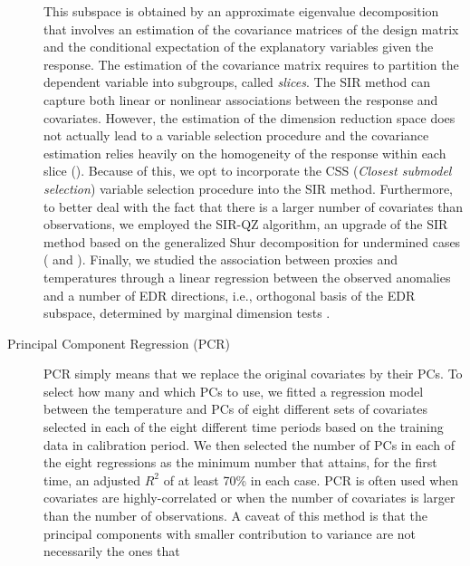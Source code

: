 \documentclass[12pt]{amsart}
\theoremstyle{plain}
\theoremstyle{definition}
\theoremstyle{remark}
\begin{document}
\begin{description}
  This subspace is obtained by an approximate eigenvalue decomposition that
  involves an estimation of the covariance matrices of the design matrix and
  the conditional expectation of the explanatory variables given the
  response. The
  estimation of the covariance matrix requires to partition the dependent variable into subgroups, called \textit{slices}.
  The SIR method can capture both linear or nonlinear associations between the response and
  covariates. However, the estimation of the dimension
  reduction space does not actually lead to a variable selection procedure and the
  covariance estimation relies heavily on the homogeneity of the response within
  each slice (\cite{Wu2010}). Because of this, we opt to incorporate the CSS
  (\textit{Closest submodel selection}) variable 
  selection procedure into the SIR method. Furthermore, to better deal with the fact that there is a larger number of
  covariates than observations, we employed the SIR-QZ algorithm, an upgrade of the SIR method based on the generalized Shur decomposition for undermined cases (\cite{Coudret2014} and \cite{Coudret2017}).   
  Finally, we studied the association between proxies and temperatures
  through a linear regression between the observed anomalies and a number of EDR directions, i.e., orthogonal basis of the EDR subspace, determined by marginal dimension tests \citep{Cook2004}. 
\item[Principal Component Regression (PCR)]
PCR simply means that we replace the original covariates by their PCs. To select how many and which PCs to use, we fitted a regression model between the temperature and PCs of eight different sets of covariates selected in each of the eight different time periods based on the training data in calibration period. We then selected the number of PCs in each of
the eight regressions as the minimum number that attains, for the first time, an adjusted
$R^2$ of at least 70\% in each case. PCR is often used when covariates are
highly-correlated or when the number of covariates is larger than the number of 
 observations. A caveat of this method is that the principal components
with smaller contribution to variance are not necessarily the ones that

\end{description}
\end{document}
